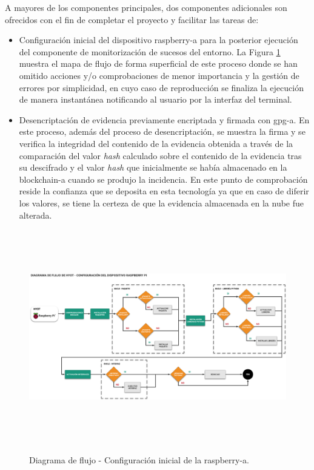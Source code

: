 \documentclass[12pt,a4paper, twoside]{report}
\begin{document}
	A mayores de los componentes principales, dos componentes adicionales son ofrecidos con el fin de completar el proyecto y facilitar las tareas de:

	\begin{itemize}
  		\item Configuración inicial del dispositivo \gls{raspberry-a} para la posterior ejecución del componente de monitorización de sucesos del entorno. La Figura \ref{fig:hyot_setupflow} muestra el mapa de flujo de forma superficial de este proceso donde se han omitido acciones y/o comprobaciones de menor importancia y la gestión de errores por simplicidad, en cuyo caso de reproducción se finaliza la ejecución de manera instantánea notificando al usuario por la interfaz del terminal.
  		
  		\item Desencriptación de evidencia previamente encriptada y firmada con \gls{gpg-a}. En este proceso, además del proceso de desencriptación, se muestra la firma y se verifica la integridad del contenido de la evidencia obtenida a través de la comparación del valor \textit{hash} calculado sobre el contenido de la evidencia tras su descifrado y el valor \textit{hash} que inicialmente se había almacenado en la \gls{blockchain-a} cuando se produjo la incidencia. En este punto de comprobación reside la confianza que se deposita en esta tecnología ya que en caso de diferir los valores, se tiene la certeza de que la evidencia almacenada en la nube fue alterada.
	\end{itemize}
	
	\begin{figure}[!ht]   
		\caption{Diagrama de flujo - Configuración inicial de la \gls{raspberry-a}.} 
		\begin{center} 
	 		\includegraphics[width=17cm,height=9.3cm]{Images/implement/hyot_setupflow} \\
			\label{fig:hyot_setupflow} 
		\end{center}  
	\end{figure}
		
\end{document}
